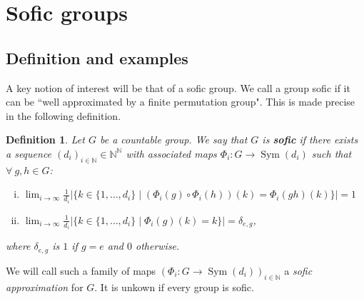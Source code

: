 \documentclass[titlepage, a4paper]{article}
\newcommand{\N}{\mathbb{N}}
\newcommand{\card}[1]{\left| #1 \right|}
\DeclareMathOperator{\sym}{Sym}
\newtheorem{definition}[theorem]{Definition}
\theoremstyle{remark}
\begin{document}
\section{Sofic groups}\label{sec:sofic_group}

\subsection{Definition and examples}

    A key notion of interest will be that of a sofic group. We call a group sofic if it can be ``well approximated by a finite permutation group". This is made precise in the following definition.

    \begin{definition}\label{def:Sofic}
	    Let $G$ be a countable group. We say that $G$ is \textbf{sofic} if there exists a sequence $(d_i)_{i \in \N} \in \N ^{\N}$ with associated maps $\Phi_i : G \to \sym(d_i)$ such that $\forall\ g, h \in G$:
        \begin{enumerate}[(i)]
            \item $\displaystyle \lim_{i\to \infty} \frac{1}{d_i} \card{\big\{k \in \{1, \dots, d_i\} \mid (\Phi_i(g) \circ \Phi_i(h))(k) = \Phi_i(gh) (k) \big\}} = 1$
            \item $\displaystyle \lim_{i\to \infty} \frac{1}{d_i}  \card{\big\{k \in \{1, \dots, d_i\} \mid \Phi_i(g)(k) = k \big\}} = \delta_{e,g}$,
        \end{enumerate}
        where $\delta_{e,g}$ is $1$ if $g = e$ and $0$ otherwise.
    \end{definition}

    We will call such a family of maps $\left(\Phi_i : G \to \sym(d_i) \right)_{i \in \N}$ a \emph{sofic approximation} for $G$. It is unkown if every group is sofic.


\end{document}
